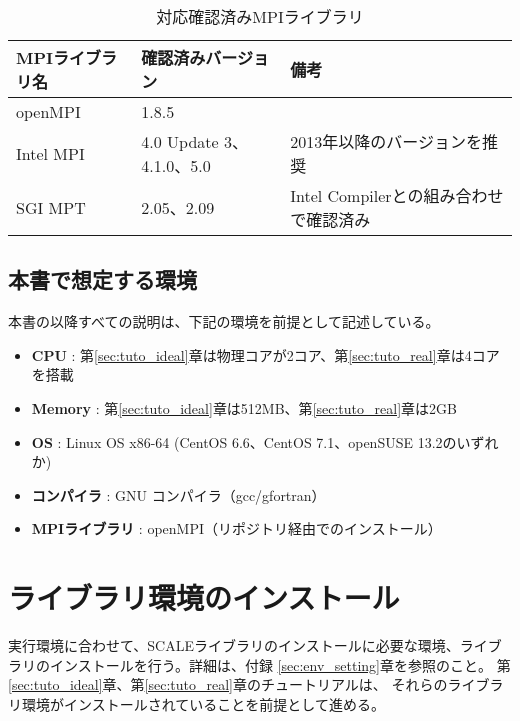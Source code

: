 \begin{table}[htb]
\begin{center}
\caption{対応確認済みMPIライブラリ}
\begin{tabularx}{150mm}{|l|l|X|} \hline
 \rowcolor[gray]{0.9} MPIライブラリ名 & 確認済みバージョン & 備考 \\ \hline
 openMPI   & 1.8.5                    & \\ \hline
 Intel MPI & 4.0 Update 3、4.1.0、5.0 & 2013年以降のバージョンを推奨 \\ \hline
 SGI MPT   & 2.05、2.09               & Intel Compilerとの組み合わせで確認済み \\ \hline
\end{tabularx}
\label{tab:compatible_mpi}
\end{center}
\end{table}


\subsection{本書で想定する環境}
\label{sec:assumed_env}
本書の以降すべての説明は、下記の環境を前提として記述している。

\begin{itemize}
 \item {\bf CPU} : 第\ref{sec:tuto_ideal}章は物理コアが2コア、第\ref{sec:tuto_real}章は4コアを搭載
 \item {\bf Memory} : 第\ref{sec:tuto_ideal}章は512MB、第\ref{sec:tuto_real}章は2GB
 \item {\bf OS} : Linux OS x86-64 (CentOS 6.6、CentOS 7.1、openSUSE 13.2のいずれか)
 \item {\bf コンパイラ} : GNU コンパイラ（gcc/gfortran）
 \item {\bf MPIライブラリ} : openMPI（リポジトリ経由でのインストール）
\end{itemize}


\section{ライブラリ環境のインストール}
\label{sec:inst_env}
実行環境に合わせて、SCALEライブラリのインストールに必要な環境、ライブラリのインストールを行う。詳細は、付録 \ref{sec:env_setting}章を参照のこと。
第\ref{sec:tuto_ideal}章、第\ref{sec:tuto_real}章のチュートリアルは、
それらのライブラリ環境がインストールされていることを前提として進める。

